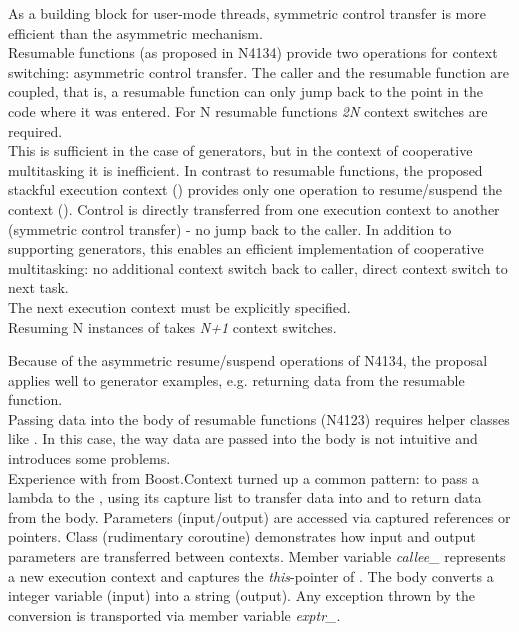 As a building block for user-mode threads, symmetric control transfer is more
efficient than the asymmetric mechanism.\\
\newline
Resumable functions (as proposed in N4134\cite{N4134}) provide two operations
for context switching: asymmetric control transfer. The caller and the
resumable function are coupled, that is, a resumable function can only jump back
to the point in the code where it was entered.
For N resumable functions \emph{2N} context switches are required.\\
\newline
This is sufficient in the case of generators, but in the context of cooperative
multitasking it is inefficient.
In contrast to resumable functions, the proposed stackful execution context
(\ectx) provides only one operation to resume/suspend the context (\ectxop).
Control is directly transferred from one execution context to
another (symmetric control transfer) - no jump back to the caller. In addition
to supporting generators, this enables an efficient implementation of
cooperative multitasking: no additional context switch back to caller,
direct context switch to next task.\\
The next execution context must be explicitly specified.\\
\newline
{}
Resuming N instances of \ectx takes \emph{N+1} context switches.

Because of the asymmetric resume/suspend operations of N4134, the proposal
applies well to generator examples, e.g. returning data from the resumable
function.\\
\newline
Passing data into the body of resumable functions (N4123) requires helper
classes like \channel.
In this case, the way data are passed into the body is not intuitive and
introduces some problems.\\
\newline
Experience with  from Boost.Context\cite{bcontext}
turned up a common pattern: to pass a lambda to the ,
using its capture list to transfer data into and to return data from the
body. Parameters (input/output) are accessed via captured references or
pointers.
Class  (rudimentary coroutine) demonstrates how input and output
parameters are transferred between contexts. Member variable
\emph{callee\_} represents a new execution context and captures the
\emph{this}-pointer of . The body converts a integer variable (input)
into a string (output). Any exception thrown by the conversion is transported
via member variable \emph{exptr\_}.

